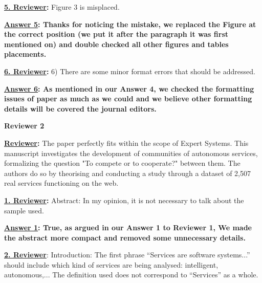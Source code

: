 \documentclass[times, 12pt,a4paper]{article}
\begin{document}
\vspace{0.5cm}\textbf{\underline{5. Reviewer}:} Figure 3 is misplaced.

\vspace{0.2cm}\textbf{\underline{Answer 5}: Thanks for noticing the mistake, we replaced the Figure at the correct position (we put it after the paragraph it was first mentioned on) and double checked all other figures and tables placements.}


\vspace{0.5cm}\textbf{\underline{6. Reviewer}:} 6) There are some minor format errors that should be addressed.

\vspace{0.2cm}\textbf{\underline{Answer 6}: As mentioned in our Answer 4, we checked the formatting issues of paper as much as we could and we believe other formatting details will be covered the journal editors.
}



\vspace{2cm}

\newpage

\begin{center}
  \textbf{Reviewer 2}
\end{center}


\textbf{\underline{Reviewer}:} The paper perfectly fits within the scope of Expert Systems. This manuscript investigates the development of communities of autonomous services, formalizing the question "To compete or to cooperate?" between them. The authors do so by theorising and conducting a study through a dataset of 2,507 real services functioning on the web.


\vspace{0.5cm}\textbf{\underline{1. Reviewer}:}  Abstract: In my opinion, it is not necessary to talk about the sample used.

\vspace{0.2cm}\textbf{\underline{Answer 1}: True, as argued in our Answer 1 to Reviewer 1, We made the abstract more compact and removed some unnecessary details. }

\vspace{0.5cm} \textbf{\underline{2. Reviewer}}:  Introduction: The first phrase ``Services are software systems...'' should include which kind of services are being analysed: intelligent, autonomous,... The definition used does not correspond to ``Services'' as a whole.
\end{document}
